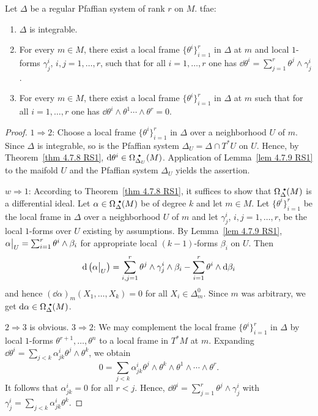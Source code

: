 \begin{prop}\label{prop 4.7.10 RS1}
    Let $\Delta$ be a regular Pfaffian system of rank $r$ on $M$. \gls{tfae}:
    \begin{enumerate}
        \item $\Delta$ is integrable.
        \item For every $m\in M$, there exist a local frame $\{\theta^i\}_{i=1}^r$ in $\Delta$ at $m$ and local $1$-forms $\gamma_j^i$, $i,j=1,\ldots,r$, such that for all $i=1,\ldots,r$ one has $\dd\theta^i=\sum_{j=1}^r \theta^j\wedge \gamma_j^i$.
        \item For every $m\in M$, there exist a local frame $\{\theta^i\}_{i=1}^r$ in $\Delta$ at $m$ such that for all $i=1,\ldots,r$ one has $\dd\theta^i\wedge \theta^1\cdots\wedge\theta^r=0$.
    \end{enumerate}
\end{prop}
\begin{proof}
    $1\Rightarrow2$: Choose a local frame $\{\theta^i\}_{i=1}^r$ in $\Delta$ over a neighborhood $U$ of $m$. Since $\Delta$ is integrable, so is the Pfaffian system $\Delta_U=\Delta\cap T^\ast U$ on $U$. Hence, by Theorem~\ref{thm 4.7.8 RS1}, $\dd\theta^i\in\Omega^{\smbullet }_{\Delta_U}(M)$. Application of Lemma~\ref{lem 4.7.9 RS1} to the maifold $U$ and the Pfaffian system $\Delta_U$ yields the assertion.

    $w\Rightarrow1$: According to Theorem~\ref{thm 4.7.8 RS1}, it suffices to show that $\Omega^{\smbullet }_\Delta(M)$ is a differential ideal. Let $\alpha\in\Omega^{\smbullet }_\Delta(M)$ be of degree $k$ and let $m\in M$. Let $\{\theta^i\}_{i=1}^r$ be the local frame in $\Delta$ over a neighborhood $U$ of $m$ and let $\gamma^i_j$, $i,j=1,\ldots,r$, be the local $1$-forms over $U$ existing by assumptions. By Lemma~\ref{lem 4.7.9 RS1}, $\restr{\alpha}{U}=\sum_{i=1}^r\theta^i\wedge\beta_i$ for appropriate local $(k-1)$-forms $\beta_i$ on $U$. Then
    \[\dd\left(\restr{\alpha}{U}\right)=\sum_{i,j=1}^r\theta^j\wedge\gamma_j^i\wedge \beta_i-\sum_{i=1}^r \theta^i\wedge\dd \beta_i\]
    and hence $(\dd\alpha)_m(X_1,\ldots,X_k)=0$ for all $X_i\in\Delta_m^0$. Since $m$ was arbitrary, we get $\dd\alpha\in\Omega^{\smbullet }_\Delta(M)$.

    $2\Rightarrow3$ is obvious. $3\Rightarrow2$: We may complement the local frame $\{\theta^i\}_{i=1}^r$ in $\Delta$ by local $1$-forms $\theta^{r+1},\ldots,\theta^n$ to a local frame in $T^\ast M$ at $m$. Expanding $\dd\theta^i=\sum_{j<k}\alpha^i_{jk}\theta^j\wedge\theta^k$, we obtain
    \[0=\sum_{j<k}\alpha^i_{jk}\theta^j\wedge\theta^k\wedge\theta^1\wedge\cdots\wedge\theta^r.\]
    It follows that $\alpha^i_{jk}=0$ for all $r<j$. Hence, $\dd\theta^i=\sum_{j=1}^r\theta^j\wedge\gamma_j^i$ with $\gamma^i_j=\sum_{j<k}\alpha^i_{jk}\theta^k$.
\end{proof}



